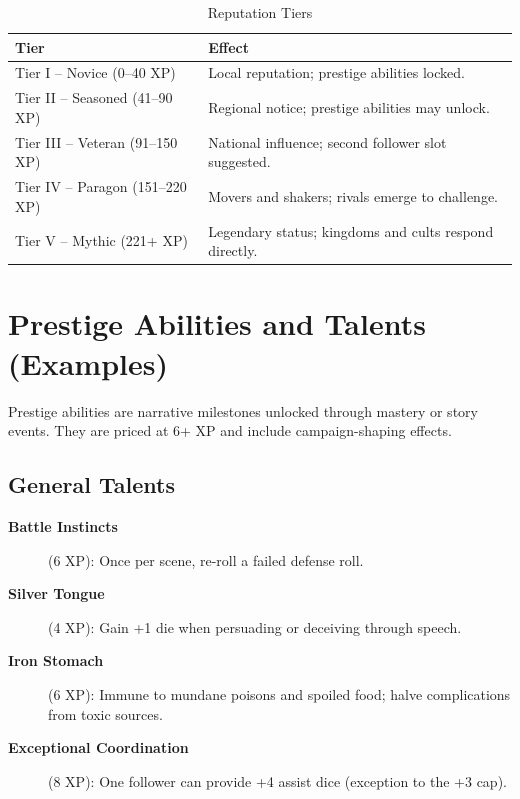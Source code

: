 \begin{longtable}{p{3.5cm} p{9cm}}
\caption{Reputation Tiers}\label{tab:reputation_tiers}\\
\toprule
\textbf{Tier} & \textbf{Effect} \\
\midrule
Tier I -- Novice (0--40 XP) & Local reputation; prestige abilities locked. \\
Tier II -- Seasoned (41--90 XP) & Regional notice; prestige abilities may unlock. \\
Tier III -- Veteran (91--150 XP) & National influence; second follower slot suggested. \\
Tier IV -- Paragon (151--220 XP) & Movers and shakers; rivals emerge to challenge. \\
Tier V -- Mythic (221+ XP) & Legendary status; kingdoms and cults respond directly. \\
\bottomrule
\end{longtable}

\section{Prestige Abilities and Talents (Examples)}\label{sec:prestige_abilities}

Prestige abilities are narrative milestones unlocked through mastery or story events. They are priced at 6+ XP and include campaign-shaping effects.

\subsection{General Talents}\label{subsec:general_talents}

\begin{description}
    \item[\textbf{Battle Instincts}] (6 XP): Once per scene, re-roll a failed defense roll.
    \item[\textbf{Silver Tongue}] (4 XP): Gain +1 die when persuading or deceiving through speech.
    \item[\textbf{Iron Stomach}] (6 XP): Immune to mundane poisons and spoiled food; halve complications from toxic sources.
    \item[\textbf{Exceptional Coordination}] (8 XP): One follower can provide +4 assist dice (exception to the +3 cap).
\end{description}

